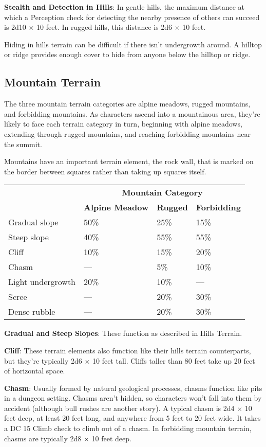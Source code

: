 \textbf{Stealth and Detection in Hills}: In gentle hills, the maximum distance at which a Perception check for detecting the nearby presence of others can succeed is 2d10 \mbox{$\times$} 10 feet. In rugged hills, this distance is 2d6 \mbox{$\times$} 10 feet.
				
Hiding in hills terrain can be difficult if there isn't undergrowth around. A hilltop or ridge provides enough cover to hide from anyone below the hilltop or ridge.
				
\subsection{Mountain Terrain}

				
The three mountain terrain categories are alpine meadows, rugged mountains, and forbidding mountains. As characters ascend into a mountainous area, they're likely to face each terrain category in turn, beginning with alpine meadows, extending through rugged mountains, and reaching forbidding mountains near the summit.
				
Mountains have an important terrain element, the rock wall, that is marked on the border between squares rather than taking up squares itself. 
								
\begin{tabular}{llll}
 & \multicolumn{3}{c}{\textbf{Mountain Category}}\\
 & \textbf{Alpine Meadow} & \textbf{Rugged} & \textbf{Forbidding} \\
Gradual slope & 50\% & 25\% & 15\%\\
Steep slope & 40\% & 55\% & 55\%\\
Cliff & 10\% & 15\% & 20\%\\
Chasm & --- & 5\% & 10\%\\
Light undergrowth & 20\% & 10\% & ---\\
Scree & --- & 20\% & 30\%\\
Dense rubble & --- & 20\% & 30\% \\
\end{tabular}
				
\textbf{Gradual and Steep Slopes}: These function as described in Hills Terrain.
				
\textbf{Cliff}: These terrain elements also function like their hills terrain counterparts, but they're typically 2d6 \mbox{$\times$} 10 feet tall. Cliffs taller than 80 feet take up 20 feet of horizontal space.
				
\textbf{Chasm}: Usually formed by natural geological processes, chasms function like pits in a dungeon setting. Chasms aren't hidden, so characters won't fall into them by accident (although bull rushes are another story). A typical chasm is 2d4 \mbox{$\times$} 10 feet deep, at least 20 feet long, and anywhere from 5 feet to 20 feet wide. It takes a DC 15 Climb check to climb out of a chasm. In forbidding mountain terrain, chasms are typically 2d8 \mbox{$\times$} 10 feet deep.
				
